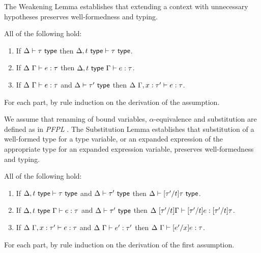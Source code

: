 The Weakening Lemma establishes that extending a context with unnecessary hypotheses preserves well-formedness and typing.
\begin{lemma}[Weakening]\label{lemma:weakening-U} All of the following hold: 
\begin{enumerate} 
\item If $\Delta \vdash \tau~\mathsf{type}$ then $\Delta, t~\mathsf{type} \vdash \tau~\mathsf{type}$.
\item If $\Delta~\Gamma \vdash e : \tau$ then $\Delta, t~\mathsf{type}~\Gamma \vdash e : \tau$.
\item If $\Delta~\Gamma \vdash e : \tau$ and $\Delta \vdash \tau'~\mathsf{type}$ then $\Delta~\Gamma, x : \tau' \vdash e : \tau$.
\end{enumerate}
\end{lemma}
\begin{proof-sketch} For each part, by rule induction on the derivation of the assumption. 
\end{proof-sketch}

We assume that renaming of bound variables, $\alpha$-equivalence and substitution are defined as in \emph{PFPL} \cite{pfpl}. The Substitution Lemma establishes that substitution of a well-formed type for a type variable, or an expanded expression of the appropriate type for an expanded expression variable, preserves well-formedness and typing. 
\begin{lemma}[Substitution]\label{lemma:substitution-U} All of the following hold:
\begin{enumerate}
\item If $\Delta, t~\mathsf{type} \vdash \tau~\mathsf{type}$ and $\Delta \vdash \tau'~\mathsf{type}$ then $\Delta \vdash [\tau'/t]\tau~\mathsf{type}$.
\item If $\Delta, t~\mathsf{type}~\Gamma \vdash e : \tau$ and $\Delta \vdash \tau'~\mathsf{type}$ then $\Delta~[\tau'/t]\Gamma \vdash [\tau'/t]e : [\tau'/t]\tau$.
\item If $\Delta~\Gamma, x : \tau' \vdash e : \tau$ and $\Delta~\Gamma \vdash e' : \tau'$ then $\Delta~\Gamma \vdash [e'/x]e : \tau$.
\end{enumerate}\end{lemma}
\begin{proof-sketch}
For each part, by rule induction on the derivation of the first assumption.
\end{proof-sketch}


